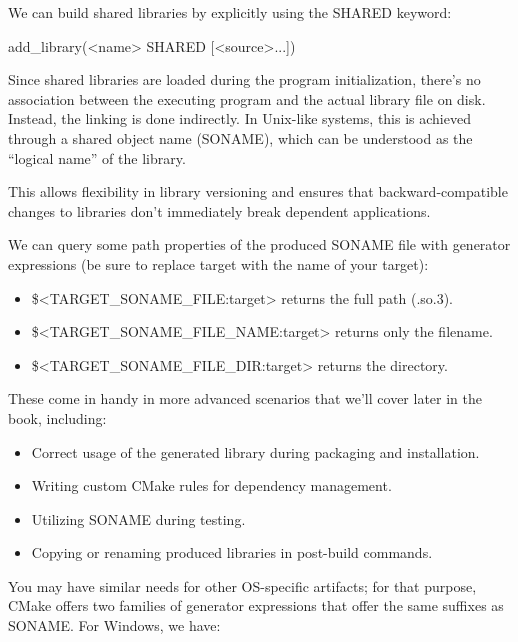We can build shared libraries by explicitly using the SHARED keyword:

\begin{shell}
add_library(<name> SHARED [<source>...])
\end{shell}

Since shared libraries are loaded during the program initialization, there’s no association between the executing program and the actual library file on disk. Instead, the linking is done indirectly. In Unix-like systems, this is achieved through a shared object name (SONAME), which can be understood as the “logical name” of the library.

This allows flexibility in library versioning and ensures that backward-compatible changes to libraries don’t immediately break dependent applications.

We can query some path properties of the produced SONAME file with generator expressions (be sure to replace target with the name of your target):

\begin{itemize}
\item
\$<TARGET\_SONAME\_FILE:target> returns the full path (.so.3).

\item
\$<TARGET\_SONAME\_FILE\_NAME:target> returns only the filename.

\item
\$<TARGET\_SONAME\_FILE\_DIR:target> returns the directory.
\end{itemize}

These come in handy in more advanced scenarios that we’ll cover later in the book, including:

\begin{itemize}
\item
Correct usage of the generated library during packaging and installation.

\item
Writing custom CMake rules for dependency management.

\item
Utilizing SONAME during testing.

\item
Copying or renaming produced libraries in post-build commands.
\end{itemize}

You may have similar needs for other OS-specific artifacts; for that purpose, CMake offers two families of generator expressions that offer the same suffixes as SONAME. For Windows, we have:

